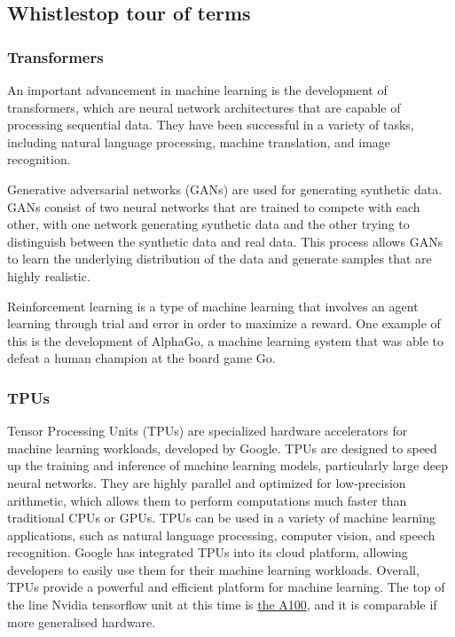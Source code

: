 \subsection{Whistlestop tour of terms}
\subsubsection{Transformers}
An important advancement in machine learning is the development of transformers, which are neural network architectures that are capable of processing sequential data. They have been successful in a variety of tasks, including natural language processing, machine translation, and image recognition. \par
Generative adversarial networks (GANs) are used for generating synthetic data. GANs consist of two neural networks that are trained to compete with each other, with one network generating synthetic data and the other trying to distinguish between the synthetic data and real data. This process allows GANs to learn the underlying distribution of the data and generate samples that are highly realistic.\par
Reinforcement learning is a type of machine learning that involves an agent learning through trial and error in order to maximize a reward. One example of this is the development of AlphaGo, a machine learning system that was able to defeat a human champion at the board game Go.\par

\subsubsection{TPUs}
Tensor Processing Units (TPUs) are specialized hardware accelerators for machine learning workloads, developed by Google. TPUs are designed to speed up the training and inference of machine learning models, particularly large deep neural networks. They are highly parallel and optimized for low-precision arithmetic, which allows them to perform computations much faster than traditional CPUs or GPUs. TPUs can be used in a variety of machine learning applications, such as natural language processing, computer vision, and speech recognition. Google has integrated TPUs into its cloud platform, allowing developers to easily use them for their machine learning workloads. Overall, TPUs provide a powerful and efficient platform for machine learning.
The top of the line Nvidia tensorflow unit at this time is \href{Accelerating TensorFlow on NVIDIA A100 GPUs}{the A100}, and it is comparable if more generalised hardware.
